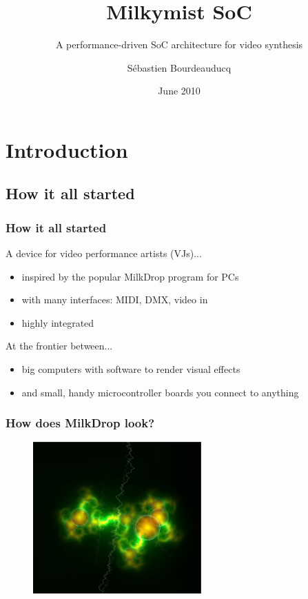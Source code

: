 \documentclass{beamer}
\title{Milkymist SoC}
\subtitle{A performance-driven SoC architecture for video synthesis}
\author{S\'ebastien Bourdeauducq}
\institute{KTH}
\date{June 2010}
\begin{document}

\section{Introduction}
\subsection{How it all started}
\frame
{
  \frametitle{How it all started}
A device for video performance artists (VJs)...
  \begin{itemize}
  \item inspired by the popular MilkDrop program for PCs
  \item with many interfaces: MIDI, DMX, video in
  \item highly integrated
  \end{itemize}

At the frontier between...
  \begin{itemize}
  \item big computers with software to render visual effects
  \item and small, handy microcontroller boards you connect to anything
  \end{itemize}
}

\frame
{
  \frametitle{How does MilkDrop look?}
  \begin{figure}[H]
  \includegraphics[height=58mm]{milkdrop1.eps}
  \end{figure}
}
\end{document}
